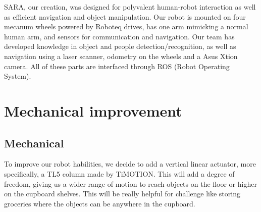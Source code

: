 \documentclass[runningheads,a4paper]{llncs}
\begin{document}
SARA, our creation, was designed for polyvalent human-robot interaction as well as efficient navigation and object manipulation. Our robot is mounted on four mecanum wheels powered by Roboteq drives, has one arm mimicking a normal human arm, and sensors for communication and navigation. Our team has developed knowledge in object and people detection/recognition, as well as navigation using a laser scanner, odometry on the wheels and a Asus Xtion camera. All of these parts are interfaced through ROS (Robot Operating System). \\

\section{Mechanical improvement}

\subsection{Mechanical}

\tab To improve our robot habilities, we decide to add a vertical linear actuator, more specifically, a TL5 column made by TiMOTION. This will add a degree of freedom, giving us a wider range of motion to reach objects on the floor or higher on the cupboard shelves. This will be really helpful for challenge like storing groceries where the objects can be anywhere in the cupboard. \\
\end{document}

